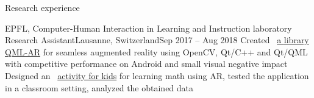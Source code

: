 \documentclass{resume} %
\newcommand*{\img}[1]{%
	\raisebox{-.02\baselineskip}{%
		\texttt{[image: \#1]}%
	}%
}
\newcommand*{\emoji}[1]{\img{./emoji/\imgpref#1.png}}
\newcommand*{\mybold}[1]{{\color{pinkunderline} #1}}
\def\imgpref{bleak-}
\newcommand{\mylink}{{\color{gray}\faExternalLink}}
\begin{document}
\begin{rSection}{Research experience}
	\begin{rSubsection}{EPFL, Computer-Human Interaction in Learning and Instruction laboratory \emoji{flag-ch}}{Research Assistant}{Lausanne, Switzerland}{Sep 2017 -- Aug 2018}
		\myitem Created \mylink~\href{https://github.com/chili-epfl/qml-ar}{a \mybold{library} QML-AR} for seamless \mybold{augmented reality} using \mybold{OpenCV, Qt/C++ and Qt/QML} with competitive performance on Android and small visual negative impact
		\myitem Designed an \mylink~\href{https://youtu.be/B4-2qYsAKH4}{activity for kids} for learning math using AR, tested the application in a classroom setting, analyzed the obtained data
	\end{rSubsection}


\end{rSection}

\end{document}
